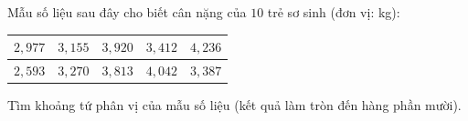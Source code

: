 \begin{ex}
Mẫu số liệu sau đây cho biết cân nặng của $10$ trẻ sơ sinh (đơn vị: kg):
\begin{center}
\begin{tabular}{|c|c|c|c|c|}\hline
$2{,}977$ & $3{,}155$ & $3{,}920$ & $3{,}412$ & $4{,}236$\\\hline
$2{,}593$ & $3{,}270$ & $3{,}813$ & $4{,}042$ & $3{,}387$\\\hline
\end{tabular}
\end{center}
Tìm khoảng tứ phân vị của mẫu số liệu (kết quả làm tròn đến hàng phần mười).
\end{ex}
